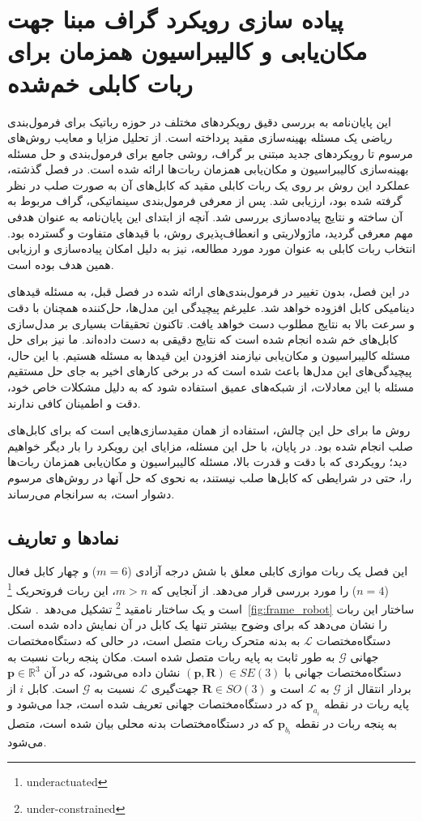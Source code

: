 \chapter{پیاده سازی رویکرد گراف مبنا جهت مکان‌یابی و کالیبراسیون همزمان برای ربات کابلی خم‌شده}
این پایان‌نامه به بررسی دقیق رویکردهای مختلف در حوزه رباتیک برای فرمول‌بندی ریاضی یک مسئله بهینه‌سازی مقید پرداخته است. از تحلیل مزایا و معایب روش‌های مرسوم تا رویکردهای جدید مبتنی بر گراف، روشی جامع برای فرمول‌بندی و حل مسئله بهینه‌سازی کالیبراسیون و مکان‌یابی همزمان ربات‌ها ارائه شده است. در فصل گذشته، عملکرد این روش بر روی یک ربات کابلی مقید که کابل‌های آن به صورت صلب در نظر گرفته شده بود، ارزیابی شد. پس از معرفی فرمول‌بندی سینماتیکی، گراف مربوط به آن ساخته و نتایج پیاده‌سازی بررسی شد. آنچه از ابتدای این پایان‌نامه به عنوان هدفی مهم معرفی گردید، ماژولاریتی و انعطاف‌پذیری روش، با قیدهای متفاوت و گسترده بود. انتخاب ربات کابلی به عنوان مورد مورد مطالعه، نیز به دلیل امکان پیاده‌سازی و ارزیابی همین هدف بوده است.

در این فصل، بدون تغییر در فرمول‌بندی‌های ارائه شده در فصل قبل، به مسئله قیدهای دینامیکی کابل افزوده خواهد شد. علیرغم پیچیدگی این مدل‌ها، حل‌کننده همچنان با دقت و سرعت بالا به نتایج مطلوب دست خواهد یافت. تاکنون تحقیقات بسیاری بر مدل‌سازی کابل‌های خم شده انجام شده است که نتایج دقیقی به دست داده‌اند. ما نیز برای حل مسئله کالیبراسیون و مکان‌یابی نیازمند افزودن این قیدها به مسئله هستیم. با این حال، پیچیدگی‌های این مدل‌ها باعث شده است که در برخی کارهای اخیر به جای حل مستقیم مسئله با این معادلات، از شبکه‌های عمیق استفاده شود که به دلیل مشکلات خاص خود، دقت و اطمینان کافی ندارند.

روش ما برای حل این چالش، استفاده از همان مقیدسازی‌هایی است که برای کابل‌های صلب انجام شده بود. در پایان، با حل این مسئله، مزایای این رویکرد را بار دیگر خواهیم دید؛ رویکردی که با دقت و قدرت بالا، مسئله کالیبراسیون و مکان‌یابی همزمان ربات‌ها را، حتی در شرایطی که کابل‌ها صلب نیستند، به نحوی که حل آنها در روش‌های مرسوم دشوار است، به سرانجام می‌رساند.



\section{نمادها و تعاریف} \label{subsec:Assm}
این فصل یک ربات موازی کابلی معلق با شش درجه آزادی ($m=6$) و چهار کابل فعال ($n=4$) را مورد بررسی قرار می‌دهد. از آنجایی که $m>n$، این ربات فروتحریک
\footnote{underactuated}
 است و یک ساختار نامقید
\footnote{under-constrained}
تشکیل می‌دهد~\cite{ida2021natural}. 
شکل~\ref{fig:frame_robot} ساختار این ربات را نشان می‌دهد که برای وضوح بیشتر تنها یک کابل در آن نمایش داده شده است. 
دستگاه‌مختصات $\mathcal{L}$ به بدنه متحرک ربات متصل است، در حالی که دستگاه‌مختصات جهانی $\mathcal{G}$ به طور ثابت به پایه ربات متصل شده است. مکان پنجه ربات نسبت به دستگاه‌مختصات جهانی با
 $(\bm{p},\bm{R}) \in SE(3)$
نشان داده می‌شود، که در آن
 $\bm{p} \in \mathbb{R}^3$
بردار انتقال از $\mathcal{G}$ به $\mathcal{L}$ است و
 $\bm{R} \in SO(3)$
جهت‌گیری $\mathcal{L}$ نسبت به $\mathcal{G}$ است. کابل $i$ از پایه ربات در نقطه $\bm{p}_{a_i}$ که در دستگاه‌مختصات جهانی تعریف شده است، جدا می‌شود و به پنجه ربات در نقطه $\bm{p}_{b_i}$ که در دستگاه‌مختصات بدنه محلی بیان شده است، متصل می‌شود.

